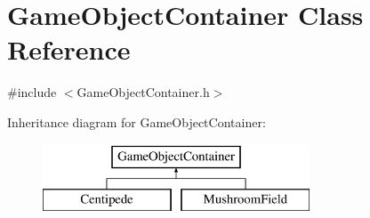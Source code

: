 \hypertarget{class_game_object_container}{}\section{Game\+Object\+Container Class Reference}
\label{class_game_object_container}


{\ttfamily \#include $<$Game\+Object\+Container.\+h$>$}

Inheritance diagram for Game\+Object\+Container\+:\begin{figure}[H]
\begin{center}
\leavevmode
\includegraphics[height=2.000000cm]{class_game_object_container}
\end{center}
\end{figure}
